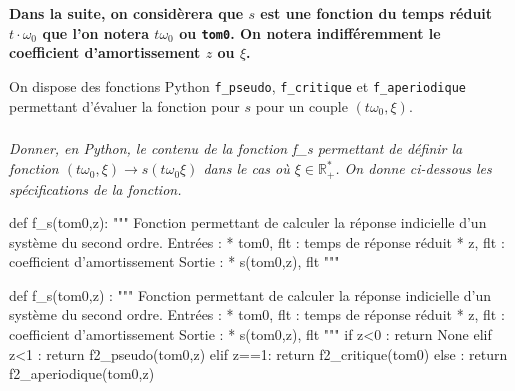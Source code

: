 \documentclass[10pt,fleqn]{article} %
\begin{document}
\textbf{Dans la suite, on considèrera que $s$ est une fonction du temps réduit $t\cdot\omega_0$ que l'on notera $t\omega_0$ ou \texttt{tom0}. On notera indifféremment le coefficient d'amortissement $z$ ou $\xi$.}



\fi

\ifprof
\else
On dispose des fonctions Python \texttt{f\_pseudo}, \texttt{f\_critique} et \texttt{f\_aperiodique} permettant d'évaluer la fonction pour $s$ pour un couple $(t\omega_0,\xi)$.
\fi




\subparagraph{} \textit{Donner, en Python, le contenu de la fonction \textsf{f\_s} permettant de définir la fonction $(t\omega_0,\xi) \rightarrow s(t\omega_0\xi)$ dans le cas où $\xi\in \mathbb{R}_+^*$. On donne ci-dessous les spécifications de la fonction.}
\ifprof
\else
\begin{py}
\begin{python}
def f_s(tom0,z):
    """
    Fonction permettant de calculer la réponse indicielle d'un système du second ordre. 
    Entrées : 
        * tom0, flt : temps de réponse réduit
        * z, flt : coefficient d'amortissement
    Sortie : 
        * s(tom0,z), flt
    """
\end{python}
\end{py}
\fi

\ifprof
\begin{corrige}
\begin{py}
\begin{python}
def f_s(tom0,z) :
    """
    Fonction permettant de calculer la réponse indicielle d'un système du second ordre. 
    Entrées : 
        * tom0, flt : temps de réponse réduit
        * z, flt : coefficient d'amortissement
    Sortie : 
        * s(tom0,z), flt
    """
    if z<0 :
        return None
    elif z<1 :
        return f2_pseudo(tom0,z)
    elif z==1:
        return f2_critique(tom0)
    else : 
        return f2_aperiodique(tom0,z)
\end{python}
\end{py}
\end{corrige}
\else

\fi

\ifprof
\else
\end{document}

